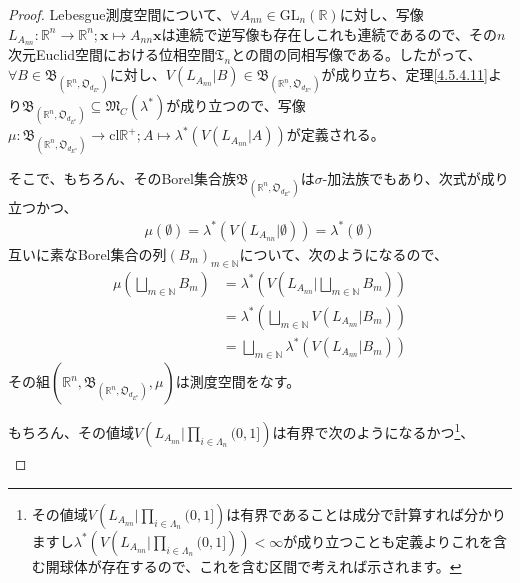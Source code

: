 \documentclass[dvipdfmx]{jsarticle}
\begin{document}
\begin{proof}
Lebesgue測度空間について、$\forall A_{nn} \in \mathrm{GL}_{n}\left( \mathbb{R} \right)$に対し、写像$L_{A_{nn}}:\mathbb{R}^{n} \rightarrow \mathbb{R}^{n};\mathbf{x} \mapsto A_{nn}\mathbf{x}$は連続で逆写像も存在しこれも連続であるので、その$n$次元Euclid空間における位相空間$\mathfrak{T}_{n}$との間の同相写像である。したがって、$\forall B \in \mathfrak{B}_{\left( \mathbb{R}^{n},\mathfrak{O}_{d_{E^{n}}} \right)}$に対し、$V\left( L_{A_{nn}}|B \right) \in \mathfrak{B}_{\left( \mathbb{R}^{n},\mathfrak{O}_{d_{E^{n}}} \right)}$が成り立ち、定理\ref{4.5.4.11}より$\mathfrak{B}_{\left( \mathbb{R}^{n},\mathfrak{O}_{d_{E^{n}}} \right)} \subseteq \mathfrak{M}_{C}\left( \lambda^{*} \right)$が成り立つので、写像$\mu:\mathfrak{B}_{\left( \mathbb{R}^{n},\mathfrak{O}_{d_{E^{n}}} \right)} \rightarrow \mathrm{cl}\mathbb{R}^{+};A \mapsto \lambda^{*}\left( V\left( L_{A_{nn}}|A \right) \right)$が定義される。\par
そこで、もちろん、そのBorel集合族$\mathfrak{B}_{\left( \mathbb{R}^{n},\mathfrak{O}_{d_{E^{n}}} \right)}$は$\sigma$-加法族でもあり、次式が成り立つかつ、
\begin{align*}
\mu(\emptyset) = \lambda^{*}\left( V\left( L_{A_{nn}}|\emptyset \right) \right) = \lambda^{*}(\emptyset)
\end{align*}
互いに素なBorel集合の列$\left( B_{m} \right)_{m \in \mathbb{N}}$について、次のようになるので、
\begin{align*}
\mu\left( \bigsqcup_{m \in \mathbb{N}} B_{m} \right) &= \lambda^{*}\left( V\left( L_{A_{nn}}|\bigsqcup_{m \in \mathbb{N}} B_{m} \right) \right)\\
&= \lambda^{*}\left( \bigsqcup_{m \in \mathbb{N}} {V\left( L_{A_{nn}}|B_{m} \right)} \right)\\
&= \bigsqcup_{m \in \mathbb{N}} {\lambda^{*}\left( V\left( L_{A_{nn}}|B_{m} \right) \right)}
\end{align*}
その組$\left( \mathbb{R}^{n},\mathfrak{B}_{\left( \mathbb{R}^{n},\mathfrak{O}_{d_{E^{n}}} \right)},\mu \right)$は測度空間をなす。\par
もちろん、その値域$V\left( L_{A_{nn}}|\prod_{i \in \varLambda_{n}} (0,1] \right)$は有界で次のようになるかつ\footnote{その値域$V\left( L_{A_{nn}}|\prod_{i \in \varLambda_{n}} (0,1] \right)$は有界であることは成分で計算すれば分かりますし$\lambda^{*}\left( V\left( L_{A_{nn}}|\prod_{i \in \varLambda_{n}} (0,1] \right) \right) < \infty$が成り立つことも定義よりこれを含む開球体が存在するので、これを含む区間で考えれば示されます。}、
\begin{align*}

\end{align*}
\end{proof}
\end{document}
